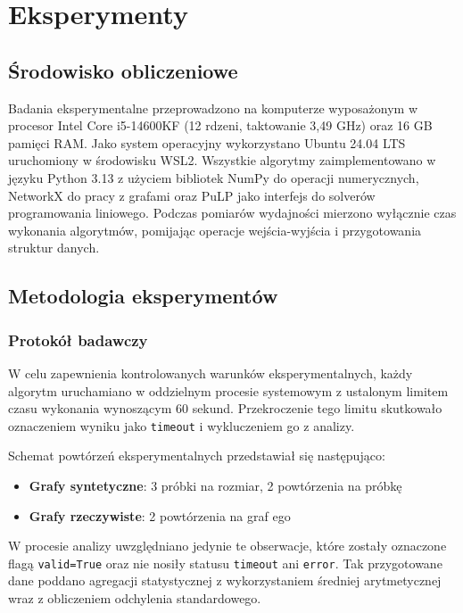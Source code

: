 \chapter{Eksperymenty}\label{chap:experiments}

\section{Środowisko obliczeniowe}

Badania eksperymentalne przeprowadzono na komputerze wyposażonym w procesor Intel Core i5-14600KF (12 rdzeni, taktowanie 3,49 GHz) oraz 16 GB pamięci RAM. Jako system operacyjny wykorzystano Ubuntu 24.04 LTS uruchomiony w środowisku WSL2. Wszystkie algorytmy zaimplementowano w języku Python 3.13 z użyciem bibliotek NumPy do operacji numerycznych, NetworkX do pracy z grafami oraz PuLP jako interfejs do solverów programowania liniowego. Podczas pomiarów wydajności mierzono wyłącznie czas wykonania algorytmów, pomijając operacje wejścia-wyjścia i przygotowania struktur danych.

\section{Metodologia eksperymentów}

\subsection{Protokół badawczy}

W celu zapewnienia kontrolowanych warunków eksperymentalnych, każdy algorytm uruchamiano w oddzielnym procesie systemowym z ustalonym limitem czasu wykonania wynoszącym 60 sekund. Przekroczenie tego limitu skutkowało oznaczeniem wyniku jako \texttt{timeout} i wykluczeniem go z analizy.

Schemat powtórzeń eksperymentalnych przedstawiał się następująco:

\begin{itemize}
\item \textbf{Grafy syntetyczne}: 3 próbki na rozmiar, 2 powtórzenia na próbkę
\item \textbf{Grafy rzeczywiste}: 2 powtórzenia na graf ego
\end{itemize}

W procesie analizy uwzględniano jedynie te obserwacje, które zostały oznaczone flagą \texttt{valid=True} oraz nie nosiły statusu \texttt{timeout} ani \texttt{error}. Tak przygotowane dane poddano agregacji statystycznej z wykorzystaniem średniej arytmetycznej wraz z obliczeniem odchylenia standardowego.

